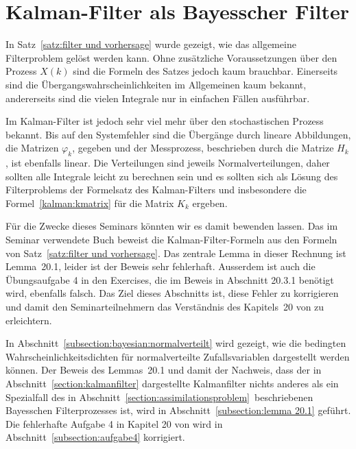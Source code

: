 %
%
%

\newtheorem*{lemma*}{Lemma}

\section{Kalman-Filter als Bayesscher Filter}
In Satz~\ref{satz:filter und vorhersage} wurde gezeigt, wie das allgemeine
Filterproblem gelöst werden kann.
Ohne zusätzliche Voraussetzungen über den Prozess $X(k)$ sind die Formeln
des Satzes jedoch kaum brauchbar.
Einerseits sind die Übergangswahrscheinlichkeiten im Allgemeinen kaum
bekannt, andererseits sind die vielen Integrale nur in einfachen
Fällen ausführbar.

Im Kalman-Filter ist jedoch sehr viel mehr über den stochastischen 
Prozess bekannt.
Bis auf den Systemfehler sind die Übergänge durch lineare Abbildungen,
die Matrizen $\varphi_k$, gegeben und der Messprozess, beschrieben durch
die Matrize $H_k$, ist ebenfalls linear.
Die Verteilungen sind jeweils Normalverteilungen, daher sollten
alle Integrale leicht zu berechnen sein und es sollten sich als Lösung
des Filterproblems der Formelsatz des Kalman-Filters und insbesondere
die Formel~\eqref{kalman:kmatrix} für die Matrix $K_k$ ergeben.

Für die Zwecke dieses Seminars könnten wir es damit bewenden lassen.
Das im Seminar verwendete Buch \cite{skript:kaperengler} beweist die
Kalman-Filter-Formeln aus den Formeln von Satz~\ref{satz:filter und vorhersage}.
Das zentrale Lemma in dieser Rechnung ist Lemma~20.1, leider ist
der Beweis sehr fehlerhaft.
Ausserdem ist auch die Übungsaufgabe 4 in den Exercises, die im Beweis in
Abschnitt 20.3.1 benötigt wird, ebenfalls falsch.
Das Ziel dieses Abschnitts ist, diese Fehler zu korrigieren und damit
den Seminarteilnehmern das Verständnis des Kapitels~20 von
\cite{skript:kaperengler} zu erleichtern.

In Abschnitt~\ref{subsection:bayesian:normalverteilt} wird gezeigt,
wie die bedingten Wahrscheinlichkeitsdichten für normalverteilte
Zufallsvariablen dargestellt werden können.
Der Beweis des Lemmas~20.1 und damit der Nachweis, dass der in
Abschnitt~\ref{section:kalmanfilter} dargestellte Kalmanfilter nichts
anderes als ein Spezialfall des in
Abschnitt~\ref{section:assimilationsproblem} beschriebenen Bayesschen
Filterprozesses ist, wird in Abschnitt~\ref{subsection:lemma 20.1}
geführt.
Die fehlerhafte Aufgabe 4 in Kapitel 20 von \cite{skript:kaperengler}
wird in Abschnitt~\ref{subsection:aufgabe4} korrigiert.

